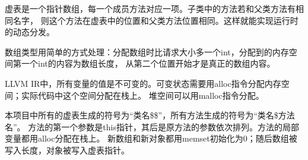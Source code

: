 \documentclass[a4paper]{article}
\begin{document}
虚表是一个指针数组，每一个成员方法对应一项。子类中的方法若和父类方法有相同名字，
则这个方法在虚表中的位置和父类方法位置相同。这样就能实现运行时的动态分发。

数组类型用简单的方式处理：分配数组时比请求大小多一个int，分配到的内存空间第一个int的内容为数组长度，
从第二个位置开始才是真正的数组内容。

LLVM IR中，所有变量的值是不可变的。可变状态需要用alloc指令分配内存空间；实际代码中这个空间分配在栈上。
堆空间可以用malloc指令分配。

本项目中所有的虚表生成的符号为“类名\$\$”，所有方法生成的符号为“类名\$方法名”。
方法的第一个参数是this指针，其后是原方法的参数依次排列。方法的局部变量都用alloc分配在栈上。
新数组和新对象都用memset初始化为0；随后数组被写入长度，对象被写入虚表指针。
\end{document}
